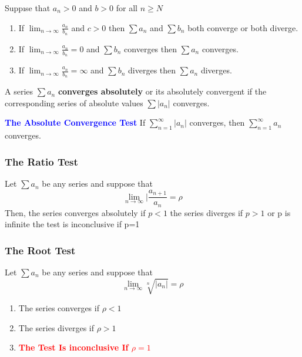 \documentclass[12pt,a4paper]{article}
\newenvironment{definition}{\begin{definitionbox}}{\end{definitionbox}\vspace{1\baselineskip}}
\newenvironment{theorem}{\begin{theorembox}}{\end{theorembox}\vspace{1\baselineskip}}
\newcommand{\infsum}{\sum_{n=1}^{\infty}}
\begin{document}
\begin{theorem}
    Suppıse that \(a_n > 0 \) and \(b > 0\) for all \(n \geq N\)
\begin{enumerate}
    \item If \(\lim_{n \to \infty}\frac{a_n}{b_n}\) and  \(c>0\) then \(\sum a_n\) and \(\sum b_n\) both converge or both diverge.
    \item If \(\lim_{n \to \infty}\frac{a_n}{b_n} = 0\)  and \(\sum b_n\) converges then \(\sum a_n\) converges.
    \item If \(\lim_{n \to \infty}\frac{a_n}{b_n} = \infty\) and \(\sum b_n \) diverges then \(\sum a_n\) diverges.
    
\end{enumerate}
\end{theorem}
\newpage
\begin{definition}
    A series \(\sum a_n\) \textbf{converges absolutely} or its absolutely convergent if the corresponding series of absolute values \(\sum |a_n|\) converges.

\end{definition}
\begin{theorem}
    \textcolor{blue}{\textbf{The Absolute Convergence Test}}
    If \(\infsum |a_n|\) converges, then \(\infsum a_n\) converges.
\end{theorem}


\subsubsection*{The Ratio Test}

\begin{theorem}
    Let \(\sum a_n\) be any series and suppose that 
    \[\lim_{n \to \infty}|\frac{a_{n+1}}{a_n} = \rho\]
    Then, the series converges absolutely if \(p < 1\) the series diverges if \(p>1\) or p is infinite the test is inconclusive if p=1
\end{theorem}
\subsubsection*{The Root Test}

\begin{theorem}
    Let \(\sum a_n\) be any series and suppose that
    \[\lim_{n \to \infty}\sqrt[n]{|a_n|} = \rho\]
    \begin{enumerate}[\alph*]
        \item The series converges if \(\rho < 1\) 
        \item The series diverges if \(\rho >1 \)
        \item \textcolor{red}{\textbf{The Test Is inconclusive If \(\rho = 1 \)}}
    \end{enumerate}
\end{theorem}
\end{document}
